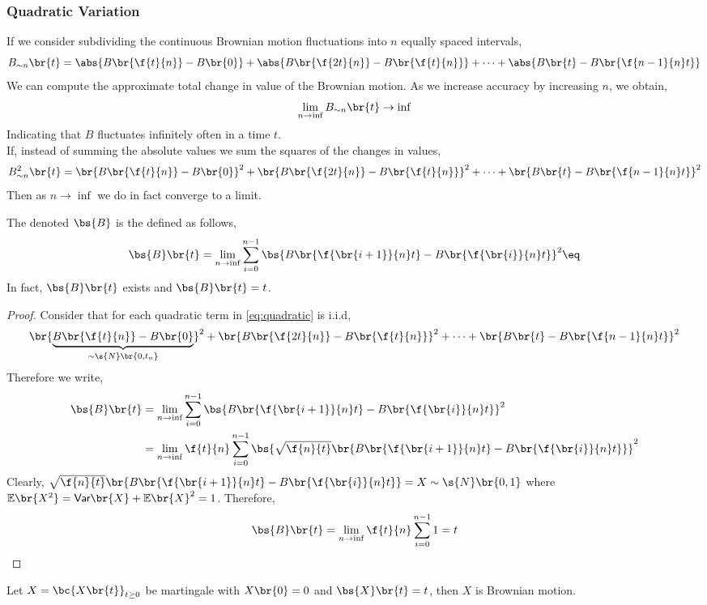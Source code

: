 \documentclass{article}
\newcommand{\Var}{\textsf{Var}}
\newcommand{\Exp}{\mathbb{E}}
\begin{document}
    \subsubsection{Quadratic Variation}
    If we consider subdividing the continuous Brownian motion fluctuations into $n$ equally spaced intervals,
    \[ B_{\sim n}\br{t} = \abs{B\br{\f{t}{n}} - B\br{0}} + \abs{B\br{\f{2t}{n}} - B\br{\f{t}{n}}} + \cdots + \abs{B\br{t} - B\br{\f{n-1}{n}t}} \]
    We can compute the approximate total change in value of the Brownian motion. As we increase accuracy by increasing $n$, we obtain,
    \[ \lim_{n \to \inf} B_{\sim n}\br{t} \to \inf \]
    Indicating that $B$ fluctuates infinitely often in a time $t$.\\

    If, instead of summing the absolute values we sum the squares of the changes in values,
    \[ B^2_{\sim n}\br{t} = \br{B\br{\f{t}{n}} - B\br{0}}^2 + \br{B\br{\f{2t}{n}} - B\br{\f{t}{n}}}^2 + \cdots + \br{B\br{t} - B\br{\f{n-1}{n}t}}^2 \]
    Then as $n \to \inf$ we do in fact converge to a limit.
    \begin{definition}
        The  denoted $\bs{B}$ is the defined as follows,
        \[ \bs{B}\br{t} = \lim_{n \to \inf} \sum_{i = 0}^{n-1} \bs{B\br{\f{\br{i+1}}{n} t} - B\br{\f{\br{i}}{n} t}}^2 \eq \label{eq:quadratic} \]
        In fact, $\bs{B}\br{t}$ exists and $\bs{B}\br{t} = t$.
    \end{definition}
    \begin{proof}
        Consider that for each quadratic term in \cref{eq:quadratic} is i.i.d,
        \[ \br{\underbrace{B\br{\f{t}{n}} - B\br{0}}_{\sim\s{N}\br{0, t_{n}}}}^2 + \br{B\br{\f{2t}{n}} - B\br{\f{t}{n}}}^2 + \cdots + \br{B\br{t} - B\br{\f{n-1}{n}t}}^2 \]
        Therefore we write,
        \begin{align*}
            \bs{B}\br{t} &= \lim_{n \to \inf} \sum_{i = 0}^{n-1} \bs{B\br{\f{\br{i+1}}{n} t} - B\br{\f{\br{i}}{n} t}}^2 \\
            &= \lim_{n \to \inf} \f{t}{n}\sum_{i = 0}^{n-1} \bs{\sqrt{\f{n}{t}}\br{B\br{\f{\br{i+1}}{n} t} - B\br{\f{\br{i}}{n} t}}}^2
        \end{align*}
        Clearly, $\sqrt{\f{n}{t}}\br{B\br{\f{\br{i+1}}{n} t} - B\br{\f{\br{i}}{n} t}} = X \sim \s{N}\br{0,1}$ where $\Exp\br{X^2} = \Var\br{X} + \Exp\br{X}^2 = 1$. Therefore,
        \[ \bs{B}\br{t} = \lim_{n \to \inf} \f{t}{n}\sum_{i = 0}^{n-1} 1 = t\]
    \end{proof}
    \begin{theorem}
         Let $X = \bc{X\br{t}}_{t \geq 0}$ be martingale with $X\br{0} = 0$ and $\bs{X}\br{t} = t$, then $X$ is Brownian motion.
    \end{theorem}
\end{document}

